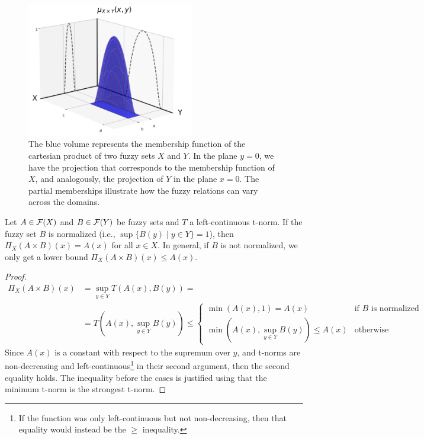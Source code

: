   \begin{figure}[ht]
      \centering
      \includegraphics[width=0.65\textwidth]{ch1/figures/fuzzy_cart_prod.png}
      \caption{The blue volume represents the membership function of the cartesian product of two fuzzy sets $X$ and $Y$. In the plane $y=0$, we have the projection that corresponds to the membership function of $X$, and analogously, the projection of $Y$ in the plane $x=0$. The partial memberships illustrate how the fuzzy relations can vary across the domains.}
      \label{fig:fuzzy_cart_prod}
  \end{figure}



\begin{proposition}
  Let $A \in \mathcal{F}(X)$ and $B \in \mathcal{F}(Y)$ be fuzzy sets and $T$ a left-continuous t-norm. If the fuzzy set $B$ is normalized (i.e., $\sup\{B(y) \mid y \in Y\}  = 1$), then $\Pi_X(A \times B)(x) = A(x)$ for all $x \in X$. 
  In general, if $B$ is not normalized, we only get a lower bound $\Pi_X(A \times B)(x) \le A(x)$.
  \end{proposition}
  
  \begin{proof}
  \begin{equation*}
    \begin{split}
      \Pi_X(A \times B)(x) &= \sup_{y \in Y} T(A(x), B(y))= \\
      &= T(A(x), \sup_{y \in Y} B(y)) \leq
      \begin{cases}
        \min(A(x), 1) = A(x) & \text{if } B \text{ is normalized}\\
        \min(A(x), \sup_{y \in Y} B(y)) \leq A(x) & \text{otherwise}
      \end{cases}
    \end{split}
  \end{equation*}
  Since $A(x)$ is a constant with respect to the supremum over $y$, and t-norms are non-decreasing and left-continuous\footnote{If the function was only left-continuous but not non-decreasing, then that equality would instead be the $\geq$ inequality.} in their second argument, then the second equality holds. The inequality before the cases is justified using that the minimum t-norm is the strongest t-norm.
  \end{proof}
  
